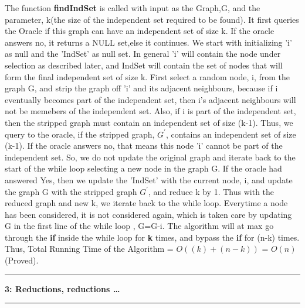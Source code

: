 \documentclass{article}
\newcommand\question[2]{\vspace{.25in}\hrule\textbf{#1: #2}\hrule\vspace{.10in}}
\begin{document}
    The function \textbf {findIndSet} is called with input as the Graph,G, and the parameter, k(the size of the independent set required to be found). It first queries the Oracle if this graph can have an independent set of size k. If the oracle answers no, it returns a NULL set,else it continues. We start with initializing 'i' as null and the 'IndSet' as null set. In general 'i' will contain the node under selection as described later, and IndSet will contain the set of nodes that will form the final independent set of size k. First select a random node, i,  from the graph G, and strip the graph off 'i' and its adjacent neighbours, because if i eventually becomes part of the independent set, then i's adjacent neighbours will not be memebers of the independent set. Also, if i is part of the independent set, then the stripped graph must contain an independent set of size (k-1). Thus, we query to the oracle, if the stripped graph, $G^\prime$, contains an independent set of size (k-1). If the oracle answers no, that means this node 'i' cannot be part of the independent set. So, we do not update the original graph and iterate back to the start of the while loop selecting a new node in the graph G. If the oracle had answered Yes, then we update the 'IndSet' with the current node, i, and update the graph G with the stripped graph $G^\prime$, and reduce k by 1. Thus with the reduced graph and new k, we iterate back to the while loop. Everytime a node has been considered, it is not considered again, which is taken care by updating G in the first line of the while loop , G=G-i. \newline
The algorithm will at max go through the \textbf {if} inside the while loop for \textbf {k} times, and bypass the \textbf {if} for (n-k) times. Thus, \newline
Total Running Time of the Algorithm = $O((k) + (n-k) )$ = $O(n)$ (Proved). \newline

\question{3}{Reductions, reductions \dots}
\end{document}
